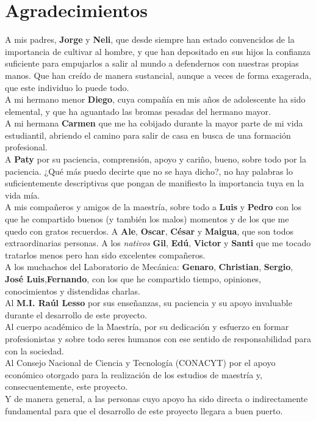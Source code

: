 \chapter*{Agradecimientos}


A mis padres, \textbf{Jorge} y \textbf{Neli}, que desde siempre han estado convencidos de la importancia de cultivar al hombre, y que 
han depositado en sus hijos la confianza suficiente para empujarlos a salir al mundo a 
defendernos con nuestras propias manos. Que han creído de manera sustancial, aunque a veces de forma 
exagerada, que este individuo lo puede todo.\\

A mi hermano menor \textbf{Diego}, cuya compañía en mis años de adolescente ha sido elemental, y que ha 
aguantado las bromas pesadas del hermano mayor.\\

A mi hermana \textbf{Carmen} que me ha cobijado durante la mayor parte de mi vida estudiantil, 
abriendo el camino para salir de casa en busca de una formación profesional.\\

A \textbf{Paty} por su paciencia, comprensión, apoyo y cariño, bueno, sobre todo por la paciencia. ¿Qué más 
puedo decirte que no se haya dicho?, no hay palabras lo suficientemente descriptivas que pongan de manifiesto 
la importancia tuya en la vida mía. \\

A mis compañeros y amigos de la maestría, sobre todo a  \textbf{Luis} y \textbf{Pedro} con los que he compartido buenos (y también los malos) momentos y de los que me quedo con gratos recuerdos. A \textbf{Ale}, \textbf{Oscar}, \textbf{César} y \textbf{Maigua}, que son todos extraordinarias personas. A los \textit{nativos} \textbf{Gil}, \textbf{Edú}, \textbf{Victor} y \textbf{Santi} que me tocado tratarlos menos pero han sido excelentes compañeros. \\

A los muchachos del Laboratorio de Mecánica: \textbf{Genaro}, \textbf{Christian}, \textbf{Sergio}, \textbf{José Luis},\textbf{Fernando}, con los que 
he compartido tiempo, opiniones, conocimientos y distendidas charlas.\\

Al \textbf{M.I. Raúl Lesso} por sus enseñanzas, su paciencia y su apoyo invaluable durante el desarrollo de este proyecto.\\

Al cuerpo académico de la Maestría, por su dedicación y esfuerzo en formar profesionistas y sobre todo 
seres humanos con ese sentido de responsabilidad para con la sociedad.\\

Al Consejo Nacional de Ciencia y Tecnología (CONACYT) por el apoyo económico otorgado para la realización de los estudios 
de maestría y, consecuentemente, este proyecto.\\

Y de manera general, a las personas cuyo apoyo ha sido directa o indirectamente fundamental para 
que el desarrollo de este proyecto llegara a buen puerto.

